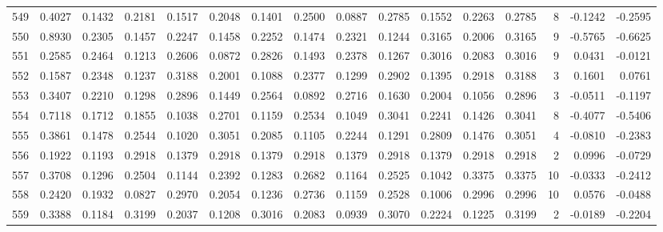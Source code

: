 \begin{tabular}{lrrrrrrrrrrrrrrr}
549 &      0.4027 &  0.1432 &  0.2181 &  0.1517 &  0.2048 &  0.1401 &  0.2500 &  0.0887 &  0.2785 &  0.1552 &   0.2263 &     0.2785 &      8 &                   -0.1242 &                    -0.2595 \\
550 &      0.8930 &  0.2305 &  0.1457 &  0.2247 &  0.1458 &  0.2252 &  0.1474 &  0.2321 &  0.1244 &  0.3165 &   0.2006 &     0.3165 &      9 &                   -0.5765 &                    -0.6625 \\
551 &      0.2585 &  0.2464 &  0.1213 &  0.2606 &  0.0872 &  0.2826 &  0.1493 &  0.2378 &  0.1267 &  0.3016 &   0.2083 &     0.3016 &      9 &                    0.0431 &                    -0.0121 \\
552 &      0.1587 &  0.2348 &  0.1237 &  0.3188 &  0.2001 &  0.1088 &  0.2377 &  0.1299 &  0.2902 &  0.1395 &   0.2918 &     0.3188 &      3 &                    0.1601 &                     0.0761 \\
553 &      0.3407 &  0.2210 &  0.1298 &  0.2896 &  0.1449 &  0.2564 &  0.0892 &  0.2716 &  0.1630 &  0.2004 &   0.1056 &     0.2896 &      3 &                   -0.0511 &                    -0.1197 \\
554 &      0.7118 &  0.1712 &  0.1855 &  0.1038 &  0.2701 &  0.1159 &  0.2534 &  0.1049 &  0.3041 &  0.2241 &   0.1426 &     0.3041 &      8 &                   -0.4077 &                    -0.5406 \\
555 &      0.3861 &  0.1478 &  0.2544 &  0.1020 &  0.3051 &  0.2085 &  0.1105 &  0.2244 &  0.1291 &  0.2809 &   0.1476 &     0.3051 &      4 &                   -0.0810 &                    -0.2383 \\
556 &      0.1922 &  0.1193 &  0.2918 &  0.1379 &  0.2918 &  0.1379 &  0.2918 &  0.1379 &  0.2918 &  0.1379 &   0.2918 &     0.2918 &      2 &                    0.0996 &                    -0.0729 \\
557 &      0.3708 &  0.1296 &  0.2504 &  0.1144 &  0.2392 &  0.1283 &  0.2682 &  0.1164 &  0.2525 &  0.1042 &   0.3375 &     0.3375 &     10 &                   -0.0333 &                    -0.2412 \\
558 &      0.2420 &  0.1932 &  0.0827 &  0.2970 &  0.2054 &  0.1236 &  0.2736 &  0.1159 &  0.2528 &  0.1006 &   0.2996 &     0.2996 &     10 &                    0.0576 &                    -0.0488 \\
559 &      0.3388 &  0.1184 &  0.3199 &  0.2037 &  0.1208 &  0.3016 &  0.2083 &  0.0939 &  0.3070 &  0.2224 &   0.1225 &     0.3199 &      2 &                   -0.0189 &                    -0.2204 \\

\end{tabular}
